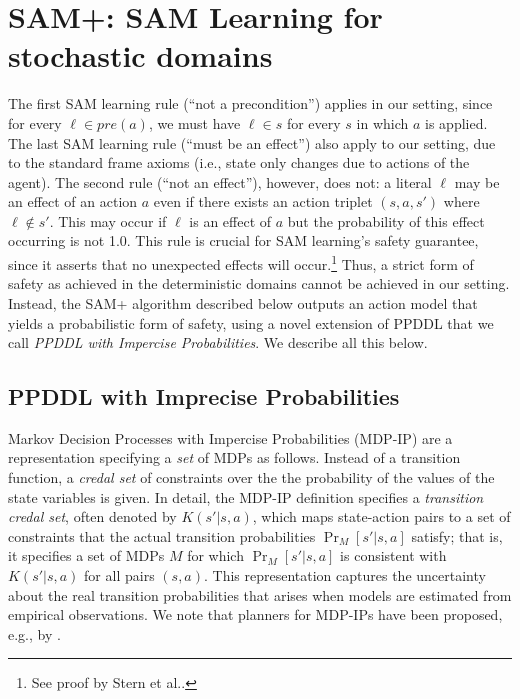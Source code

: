 \documentclass[letterpaper]{article} %
\newcommand{\pre}{\textit{pre}}
\newcommand{\tuple}[1]{\ensuremath{\left \langle #1 \right \rangle }}
\begin{document}
\section{SAM+: SAM Learning for stochastic domains}



The first SAM learning rule (``not a precondition'') applies in our setting, since for every $\ell\in\pre(a)$, we must have $\ell\in s$ for every $s$ in which $a$ is applied. 
The last SAM learning rule (``must be an effect'') also apply to our setting, due to the standard frame axioms (i.e., state only changes due to actions of the agent). 
The second rule (``not an effect''), however, does not: a literal $\ell$ may be an effect of an action $a$ even if there exists an action triplet $(s,a,s')$ where $\ell\notin s'$. 
This may occur if $\ell$ is an effect of $a$ but the probability of this effect occurring is not 1.0. 
This rule is crucial for SAM learning's safety guarantee, since it asserts that no unexpected effects will occur.\footnote{See proof by Stern et al..} 
Thus, a strict form of safety as achieved in the deterministic domains cannot be achieved in our setting. 
Instead, the SAM+ algorithm described below outputs an action model that
yields a probabilistic form of safety, using a novel extension of PPDDL that we call \emph{PPDDL with Impercise Probabilities}. 
We describe all this below. 



\subsection{PPDDL with Imprecise Probabilities}
Markov Decision Processes with Impercise Probabilities (MDP-IP) \cite{satia1973markovian}
are a representation specifying a \emph{set} of MDPs as follows. 
Instead of a transition function, a \emph{credal set} of constraints over the the probability of the values of the state variables is given. 
In detail, the MDP-IP definition specifies a \emph{transition credal set}, often denoted by $K(s'|s,a)$, which maps state-action pairs to a set of constraints that the actual transition probabilities $\Pr_{M}[s'|s,a]$ satisfy; that is, it specifies a set of MDPs $M$ for which $\Pr_{M}[s'|s,a]$ is consistent with $K(s'|s,a)$ for all pairs $(s,a)$. This representation  captures the uncertainty about the real transition probabilities that  arises when models are estimated from empirical observations.
We note that planners for MDP-IPs have been proposed, e.g., by \citet{delgado2011efficient}.
\end{document}
